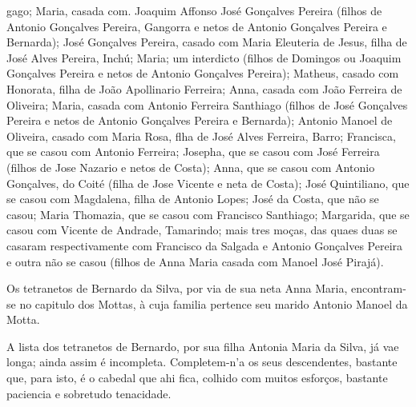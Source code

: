 gago; Maria, casada com. Joaquim Affonso José Gonçalves Pereira (filhos de Antonio Gonçalves Pereira, Gangorra e netos de Antonio Gonçalves Pereira e Bernarda); José Gonçalves Pereira, casado com Maria Eleuteria de Jesus, filha de José Alves Pereira, Inchú; Maria; um interdicto (filhos de Domingos ou Joaquim Gonçalves Pereira e netos de Antonio Gonçalves Pereira); Matheus, casado com Honorata, filha de João Apollinario Ferreira; Anna, casada com João Ferreira de Oliveira; Maria, casada com Antonio Ferreira Santhiago (filhos de José Gonçalves Pereira e netos de Antonio Gonçalves Pereira e Bernarda); Antonio Manoel de Oliveira, casado com Maria Rosa, flha de José Alves Ferreira, Barro; Francisca, que se casou com Antonio Ferreira; Josepha, que se casou com José Ferreira (filhos de Jose Nazario e netos de Costa); Anna, que se casou com Antonio Gonçalves, do Coité (filha de Jose Vicente e neta de Costa); José Quintiliano, que se casou com Magdalena, filha de Antonio Lopes; José da Costa, que não se casou; Maria Thomazia, que se casou com Francisco Santhiago; Margarida, que se casou com Vicente de Andrade, Tamarindo; mais tres moças, das quaes duas se casaram respectivamente com Francisco da Salgada e Antonio Gonçalves Pereira e outra não se casou (filhos de Anna Maria casada com Manoel José Pirajá).

Os tetranetos de Bernardo da Silva, por via de sua neta Anna Maria, encontram-se no capitulo dos Mottas, à cuja familia pertence seu marido Antonio Manoel da Motta.

A lista dos tetranetos de Bernardo, por sua filha Antonia Maria da Silva, já vae longa; ainda assim é incompleta. Completem-n'a os seus descendentes, bastante que, para isto, é o cabedal que ahi fica, colhido com muitos  esforços, bastante paciencia e sobretudo tenacidade.


